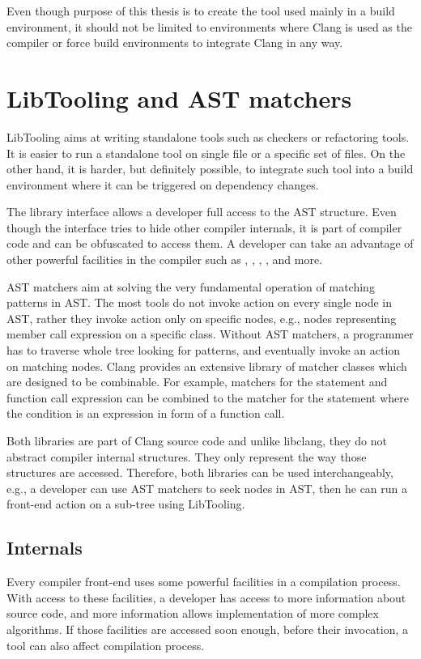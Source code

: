 Even though purpose of this thesis is to create the tool used mainly in a build environment, it should not be limited to environments where Clang is used as the compiler or force build environments to integrate Clang in any way.

\section{LibTooling and AST matchers}
LibTooling \cite{clang-libtooling} aims at writing standalone tools such as checkers or refactoring tools. It is easier to run a standalone tool on single file or a specific set of files. On the other hand, it is harder, but definitely possible, to integrate such tool into a build environment where it can be triggered on dependency changes.

The library interface allows a developer full access to the AST structure. Even though the interface tries to hide other compiler internals, it is part of compiler code and can be obfuscated to access them. A developer can take an advantage of other powerful facilities in the compiler such as , , , ,  and more.

AST matchers \cite{clang-matchers} aim at solving the very fundamental operation of matching patterns in AST. The most tools do not invoke action on every single node in AST, rather they invoke action only on specific nodes, e.g., nodes representing member call expression on a specific class. Without AST matchers, a programmer has to traverse whole tree looking for patterns, and eventually invoke an action on matching nodes. Clang provides an extensive library of matcher classes which are designed to be combinable. For example, matchers for the  statement and function call expression can be combined to the matcher for the  statement where the condition is an expression in form of a function call.

Both libraries are part of Clang source code and unlike libclang, they do not abstract compiler internal structures. They only represent the way those structures are accessed. Therefore, both libraries can be used interchangeably, e.g., a developer can use AST matchers to seek nodes in AST, then he can run a front-end action on a sub-tree using LibTooling.

\subsection{Internals}
Every compiler front-end uses some powerful facilities in a compilation process. With access to these facilities, a developer has access to more information about source code, and more information allows implementation of more complex algorithms. If those facilities are accessed soon enough, before their invocation, a tool can also affect compilation process.

